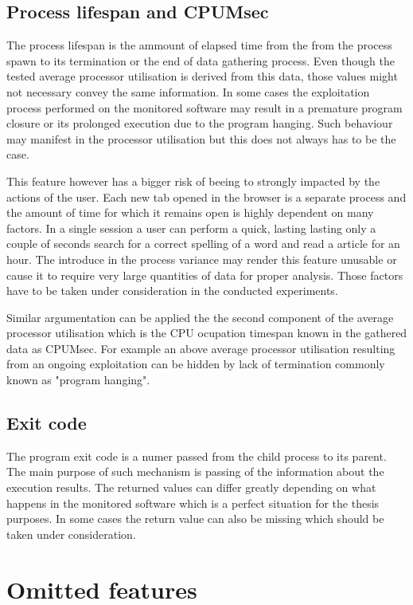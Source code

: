 \documentclass[a4paper,twoside,12pt]{book}
\begin{document}
\subsection{Process lifespan and CPUMsec}

The process lifespan is the ammount of elapsed time from the from the process spawn to its
termination or the end of data gathering process. Even though the tested average processor utilisation 
is derived from this data, those values might not necessary convey the same information. In some cases
the exploitation process performed on the monitored software may result in a premature program
closure or its prolonged execution due to the program hanging. Such behaviour may manifest in the
processor utilisation but this does not always has to be the case. 

This feature however has a bigger risk of beeing to strongly impacted by the actions of the user. 
Each new tab opened in the browser is a separate process and the amount of time for which it remains
open is highly dependent on many factors. In a single session a user can perform a quick, lasting 
lasting only a couple of seconds search for a correct spelling of a word and read a article for 
an hour. The introduce in the process variance may render this feature unusable or cause it to
require very large quantities of data for proper analysis. Those factors have to be taken 
under consideration in the conducted experiments.

Similar argumentation can be applied the the second component of the average processor utilisation which is
the CPU ocupation timespan known in the gathered data as CPUMsec. For example an above average processor utilisation
resulting from an ongoing exploitation can be hidden by lack of termination commonly known as "program hanging".

\subsection{Exit code}

The program exit code is a numer passed from the child process to its parent. The main purpose 
of such mechanism is passing of the information about the execution results. The returned values
can differ greatly depending on what happens in the monitored software which is a perfect situation
for the thesis purposes. In some cases the return value can also be missing which should be taken 
under consideration.

\section{Omitted features}
\end{document}
